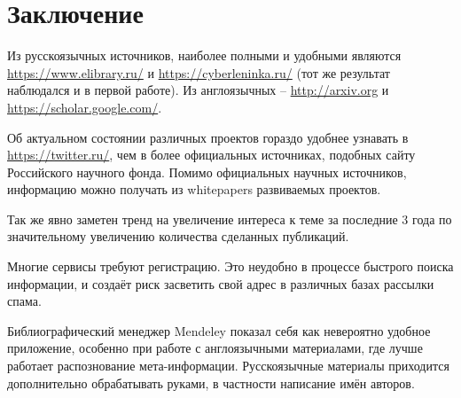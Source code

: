 \documentclass[a4paper, 12pt]{report}		%
\begin{document}
\chapter*{Заключение}


Из русскоязычных источников, наиболее полными и удобными являются \url{https://www.elibrary.ru/} и \url{https://cyberleninka.ru/} (тот же результат наблюдался и в первой работе). Из англоязычных -- \url{http://arxiv.org} и \url{https://scholar.google.com/}.


Об актуальном состоянии различных проектов гораздо удобнее узнавать в \url{https://twitter.ru/}, чем в более официальных источниках, подобных сайту Российского научного фонда. Помимо официальных научных источников, информацию можно получать из whitepapers развиваемых проектов.


Так же явно заметен тренд на увеличение интереса к теме за последние 3 года по значительному увеличению количества сделанных публикаций.


Многие сервисы требуют регистрацию. Это неудобно в процессе быстрого поиска информации, и создаёт риск засветить свой адрес в различных базах рассылки спама.


Библиографический менеджер Mendeley показал себя как невероятно удобное приложение, особенно при работе с англоязычными материалами, где лучше работает распознование мета-информации. Русскоязычные материалы приходится дополнительно обрабатывать руками, в частности написание имён авторов.
\end{document}
